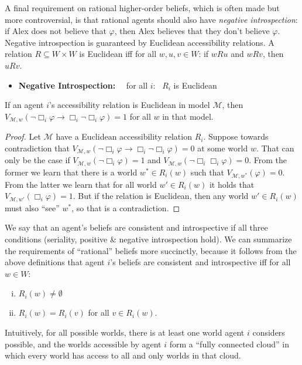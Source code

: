\documentclass[nobib,nofonts]{tufte-handout}
\newcommand{\Model}{\ensuremath{\mathcal{M}}}
\begin{document}
A final requirement on rational higher-order beliefs, which is often made but more controversial, is that rational agents should also have \emph{negative introspection}: if Alex does not believe that $\varphi$, then Alex believes that they don't believe $\varphi$.
Negative introspection is guaranteed by Euclidean accessibility relations.
A relation $R \subseteq W \times W$ is Euclidean iff for all $w,u,v \in W$: if $wRu$ and $wRv$, then $uRv$.
\begin{itemize}[]
  \item \textbf{Negative Introspection:} \ \  for all $i$: \ $R_{i}$ is Euclidean
\end{itemize}
\begin{claim}
 If an agent $i$'s accessibility relation is Euclidean in model $\Model$, then $V_{\Model,w}(\neg \Box_{i}\varphi \rightarrow \Box_{i} \neg \Box_{i}\varphi) = 1$ for all $w$ in that model.
\end{claim}
\begin{proof}
  Let $\Model$ have a Euclidean accessibility relation $R_{i}$.
  Suppose towards contradiction that $V_{\Model,w}(\neg \Box_{i}\varphi \rightarrow \Box_{i} \neg \Box_{i}\varphi) = 0$ at some world $w$.
  That can only be the case if $V_{\Model,w}( \neg \Box_{i}\varphi) = 1$ and $V_{\Model,w}( \neg \Box_{i}\Box_{i}\varphi) = 0$.
  From the former we learn that there is a world $w^{*} \in R_{i}(w)$ such that $V_{\Model, w^{*}}(\varphi)=0$.
  From the latter we learn that for all world $w' \in R_{i}(w)$ it holds that $V_{\Model,w'}(\Box_{i}\varphi) = 1$.
  But if the relation is Euclidean, then any world $w' \in R_{i}(w)$ must also ``see'' $w^{*}$, so that is a contradiction.
\end{proof}

We say that an agent's beliefs are consistent and introspective if all three conditions (seriality, positive \& negative introspection hold).
We can summarize the requirements of ``rational'' beliefs more succinctly, because it follows from the above definitions that agent $i$'s beliefs are consistent and introspective iff for all $w \in W$:
\begin{enumerate}[(i)]
  \item $R_{i}(w) \neq \emptyset$
  \item $R_{i}(w) = R_{i}(v)$ for all $v \in R_{i}(w)$.
\end{enumerate}
Intuitively, for all possible worlds, there is at least one world agent $i$ considers possible, and the worlds accessible by agent $i$ form a ``fully connected cloud'' in which every world has access to all and only worlds in that cloud.
\end{document}
